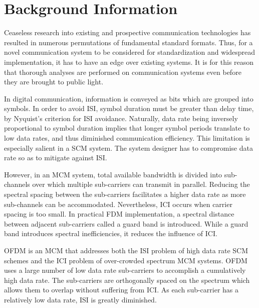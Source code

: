 \section{Background Information}
Ceaseless research into existing and prospective communication technologies has resulted in numerous permutations of fundamental standard formats. Thus, for a novel communication system to be considered for standardization and widespread implementation, it has to have an edge over existing systems. It is for this reason that thorough analyses are performed on communication systems even before they are brought to public light.

In digital communication, information is conveyed as bits which are grouped into symbols. In order to avoid \gls{ISI}, symbol duration must be greater than delay time, by Nyquist's criterion for \gls{ISI} avoidance\cite{ofdm_intro}. Naturally, data rate being inversely proportional to symbol duration implies that longer symbol periods translate to low data rates, and thus diminished communication efficiency. This limitation is especially salient in a \gls{SCM} system. The system designer has to compromise data rate so as to mitigate against \gls{ISI}.

However, in an \gls{MCM} system, total available bandwidth is divided into sub-channels over which multiple sub-carriers can transmit in parallel. Reducing the spectral spacing between the sub-carriers facilitates a higher data rate as more sub-channels can be accommodated. Nevertheless, \gls{ICI} occurs when carrier spacing is too small. In practical \gls{FDM} implementation, a spectral distance between adjacent sub-carriers called a guard band is introduced. While a guard band introduces spectral inefficiencies, it reduces the influence of \gls{ICI}.

\gls{OFDM} is an \gls{MCM} that addresses both the \gls{ISI} problem of high data rate \gls{SCM} schemes and the \gls{ICI} problem of over-crowded spectrum \gls{MCM} systems. \gls{OFDM} uses a large number of low data rate sub-carriers to accomplish a cumulatively high data rate. The sub-carriers are orthogonally spaced on the spectrum which allows them to overlap without suffering from \gls{ICI}. As each sub-carrier has a relatively low data rate, \gls{ISI} is greatly diminished.

